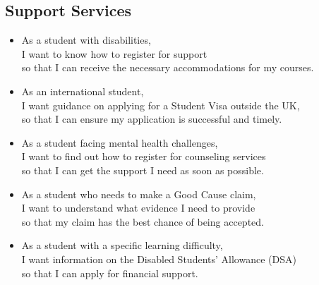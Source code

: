 \documentclass{l4proj}
\begin{document}
\begin{appendices}
\section*{Support Services}
\begin{itemize}
    \item As a student with disabilities, \\I want to know how to register for support \\so that I can receive the necessary accommodations for my courses.
    \vspace{1em}
    \item As an international student, \\I want guidance on applying for a Student Visa outside the UK, \\so that I can ensure my application is successful and timely.
    \vspace{1em}
    \item As a student facing mental health challenges, \\I want to find out how to register for counseling services \\so that I can get the support I need as soon as possible.
    \vspace{1em}
    \item As a student who needs to make a Good Cause claim, \\I want to understand what evidence I need to provide \\so that my claim has the best chance of being accepted.
    \vspace{1em}
    \item As a student with a specific learning difficulty, \\I want information on the Disabled Students' Allowance (DSA) \\so that I can apply for financial support.
   

\end{itemize}
\end{appendices}
\end{document}

